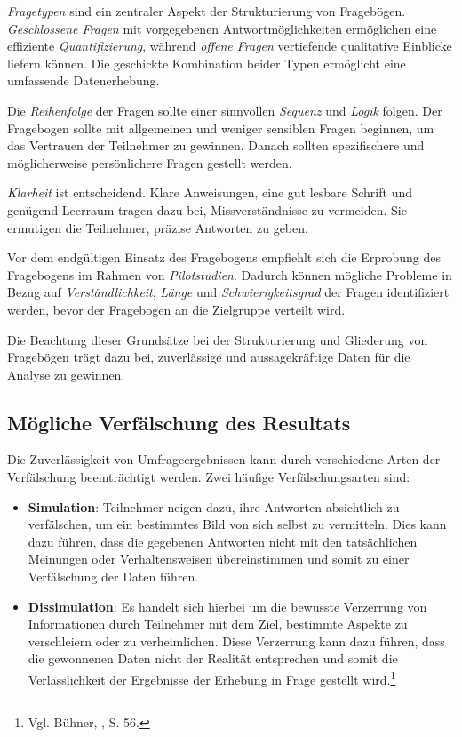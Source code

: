 \textit{Fragetypen} sind ein zentraler Aspekt der Strukturierung von Fragebögen. \textit{Geschlossene Fragen} mit
vorgegebenen Antwortmöglichkeiten ermöglichen eine effiziente \textit{Quantifizierung}, während \textit{offene Fragen}
vertiefende qualitative Einblicke liefern können. Die geschickte Kombination beider Typen ermöglicht eine umfassende
Datenerhebung.

Die \textit{Reihenfolge} der Fragen sollte einer sinnvollen \textit{Sequenz} und \textit{Logik} folgen. Der Fragebogen
sollte mit allgemeinen und weniger sensiblen Fragen beginnen, um das Vertrauen der Teilnehmer zu gewinnen. Danach sollten
spezifischere und möglicherweise persönlichere Fragen gestellt werden.

\textit{Klarheit} ist entscheidend. Klare Anweisungen, eine gut lesbare Schrift und genügend Leerraum tragen dazu bei,
Missverständnisse zu vermeiden. Sie ermutigen die Teilnehmer, präzise Antworten zu geben.

Vor dem endgültigen Einsatz des Fragebogens empfiehlt sich die Erprobung des Fragebogens im Rahmen von \textit{Pilotstudien}.
Dadurch können mögliche Probleme in Bezug auf \textit{Verständlichkeit}, \textit{Länge} und \textit{Schwierigkeitsgrad}
der Fragen identifiziert werden, bevor der Fragebogen an die Zielgruppe verteilt wird.

Die Beachtung dieser Grundsätze bei der Strukturierung und Gliederung von Fragebögen trägt dazu bei, zuverlässige und
aussagekräftige Daten für die Analyse zu gewinnen.

\subsection{Mögliche Verfälschung des Resultats}
Die Zuverlässigkeit von Umfrageergebnissen kann durch verschiedene Arten der Verfälschung beeinträchtigt werden. Zwei
häufige Verfälschungsarten sind:
\begin{itemize}
    \item \textbf{Simulation}: Teilnehmer neigen dazu, ihre Antworten absichtlich zu verfälschen, um ein bestimmtes Bild
    von sich selbst zu vermitteln. Dies kann dazu führen, dass die gegebenen Antworten nicht mit den tatsächlichen
    Meinungen oder Verhaltensweisen übereinstimmen und somit zu einer Verfälschung der Daten führen.

    \item \textbf{Dissimulation}: Es handelt sich hierbei um die bewusste Verzerrung von Informationen durch Teilnehmer
    mit dem Ziel, bestimmte Aspekte zu verschleiern oder zu verheimlichen. Diese Verzerrung kann dazu führen, dass die
    gewonnenen Daten nicht der Realität entsprechen und somit die Verlässlichkeit der Ergebnisse der Erhebung in Frage
    gestellt wird.\footnote{Vgl. Bühner, \cite{Einfuehrung in die TEst und Fragebogenkonstruktion}, S. 56.}\\
\end{itemize}

